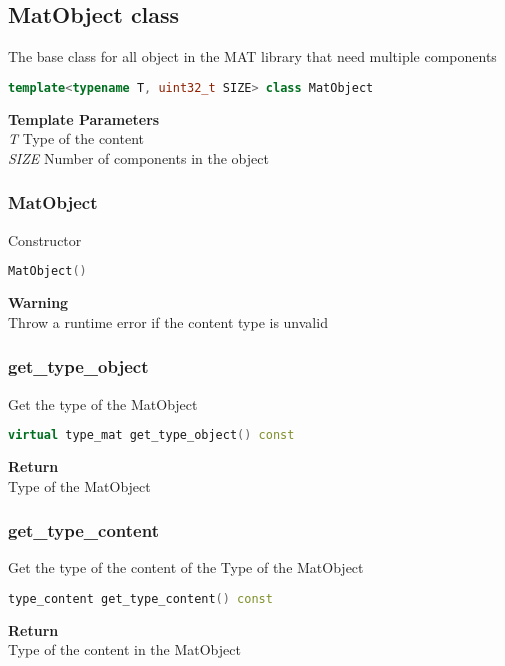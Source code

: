 \subsection{MatObject  class}
The base class for all object in the MAT library that need multiple components
\begin{lstlisting}[language=C++]
template<typename T, uint32_t SIZE> class MatObject 
\end{lstlisting}
\textbf{Template Parameters} \\ 
\textit{T} Type of the content \\ 
\textit{SIZE} Number of components in the object \\ 

\subsubsection{MatObject}
\begin{mdframed}
Constructor
\begin{lstlisting}[language=C++]
MatObject()
\end{lstlisting}
\textbf{Warning} \\ 
Throw a runtime error if the content type is unvalid\\ 
\end{mdframed}

\subsubsection{get\_type\_object}
\begin{mdframed}
Get the type of the MatObject
\begin{lstlisting}[language=C++]
virtual type_mat get_type_object() const 
\end{lstlisting}
\textbf{Return} \\ 
Type of the MatObject\\ 
\end{mdframed}

\subsubsection{get\_type\_content}
\begin{mdframed}
Get the type of the content of the Type of the MatObject
\begin{lstlisting}[language=C++]
type_content get_type_content() const 
\end{lstlisting}
\textbf{Return} \\ 
Type of the content in the MatObject\\ 
\end{mdframed}

